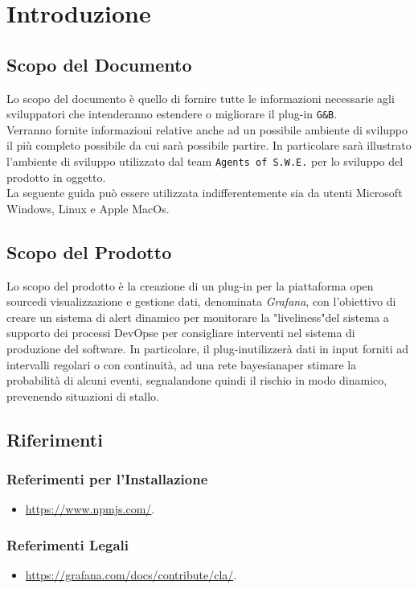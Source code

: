 \section{Introduzione}\label{Intro}
\subsection{Scopo del Documento}
Lo scopo del documento è quello di fornire tutte le informazioni necessarie agli sviluppatori che intenderanno estendere o migliorare il plug-in \texttt{G\&B}.\\
Verranno fornite informazioni relative anche ad un possibile ambiente di sviluppo il più completo possibile da cui sarà possibile partire. In particolare sarà illustrato l'ambiente di sviluppo utilizzato dal team \texttt{Agents of S.W.E.} per lo sviluppo del prodotto in oggetto.\\
La seguente guida può essere utilizzata indifferentemente sia da utenti Microsoft Windows, Linux e Apple MacOs.


\subsection{Scopo del Prodotto}
Lo scopo del prodotto è la creazione di un plug-in per la piattaforma open source\glossario di visualizzazione e gestione dati, denominata \textit{Grafana}\glossario , con l’obiettivo di creare un sistema di alert dinamico per monitorare la "liveliness"\glossario del sistema a supporto dei processi DevOps\glossario e per consigliare interventi nel sistema di produzione del software.
In particolare, il plug-in\glossario utilizzerà dati in input forniti ad intervalli regolari o con continuità, ad una rete bayesiana\glossario per stimare la probabilità di alcuni eventi, segnalandone quindi il rischio in modo dinamico, prevenendo situazioni di stallo.


\subsection{Riferimenti}\label{Riferimenti}
\subsubsection{Referimenti per l'Installazione}
\begin{itemize}
	\item \url{https://www.npmjs.com/}.
\end{itemize}

\subsubsection{Referimenti Legali}
\begin{itemize}
	\item \url{https://grafana.com/docs/contribute/cla/}.
\end{itemize}

